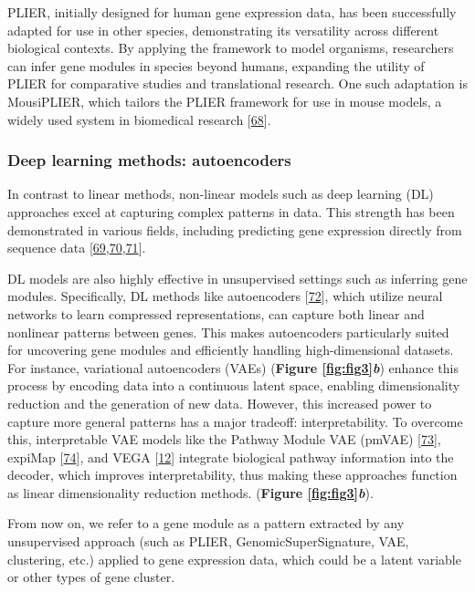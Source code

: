 PLIER, initially designed for human gene expression data, has been successfully adapted for use in other species, demonstrating its versatility across different biological contexts.
By applying the framework to model organisms, researchers can infer gene modules in species beyond humans, expanding the utility of PLIER for comparative studies and translational research.
One such adaptation is MousiPLIER, which tailors the PLIER framework for use in mouse models, a widely used system in biomedical research {[}\protect\hyperlink{ref-1CDQw6VDO}{68}{]}.

\hypertarget{deep-learning-methods-autoencoders}{%
\subsubsection{Deep learning methods: autoencoders}\label{deep-learning-methods-autoencoders}}

In contrast to linear methods, non-linear models such as deep learning (DL) approaches excel at capturing complex patterns in data.
This strength has been demonstrated in various fields, including predicting gene expression directly from sequence data {[}\protect\hyperlink{ref-1HNaN8NTb}{69},\protect\hyperlink{ref-CdrNvVBn}{70},\protect\hyperlink{ref-Gy0Zkruj}{71}{]}.

DL models are also highly effective in unsupervised settings such as inferring gene modules.
Specifically, DL methods like autoencoders {[}\protect\hyperlink{ref-NLVTJ9Lj}{72}{]}, which utilize neural networks to learn compressed representations, can capture both linear and nonlinear patterns between genes.
This makes autoencoders particularly suited for uncovering gene modules and efficiently handling high-dimensional datasets.
For instance, variational autoencoders (VAEs) (\textbf{Figure \ref{fig:fig3}\emph{b}}) enhance this process by encoding data into a continuous latent space, enabling dimensionality reduction and the generation of new data.
However, this increased power to capture more general patterns has a major tradeoff: interpretability.
To overcome this, interpretable VAE models like the Pathway Module VAE (pmVAE) {[}\protect\hyperlink{ref-nGVsOd2S}{73}{]}, expiMap {[}\protect\hyperlink{ref-JkqcQgM7}{74}{]}, and VEGA {[}\protect\hyperlink{ref-170T6ip47}{12}{]} integrate biological pathway information into the decoder, which improves interpretability, thus making these approaches function as linear dimensionality reduction methods.
(\textbf{Figure \ref{fig:fig3}\emph{b}}).

From now on, we refer to a gene module as a pattern extracted by any unsupervised approach (such as PLIER, GenomicSuperSignature, VAE, clustering, etc.) applied to gene expression data, which could be a latent variable or other types of gene cluster.

